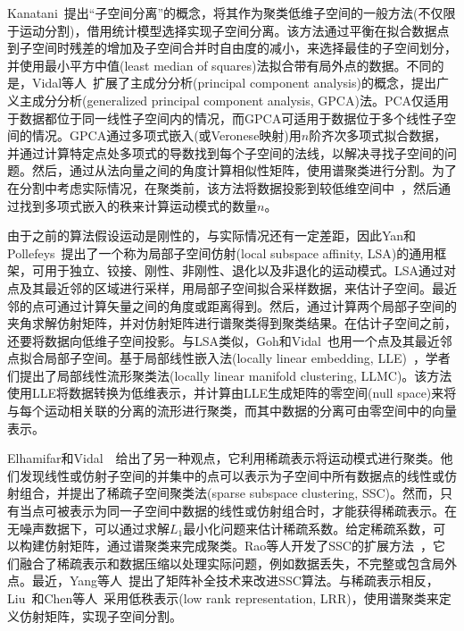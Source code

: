 Kanatani~\cite{kanatani2001motion}提出“子空间分离”的概念，将其作为聚类低维子空间的一般方法(不仅限于运动分割)，借用统计模型选择实现子空间分离。该方法通过平衡在拟合数据点到子空间时残差的增加及子空间合并时自由度的减小，来选择最佳的子空间划分，并使用最小平方中值(least median of squares)法拟合带有局外点的数据。不同的是，Vidal等人~\cite{vidal2005generalized}扩展了主成分分析(principal component analysis)的概念，提出广义主成分分析(generalized principal component analysis, GPCA)法。PCA仅适用于数据都位于同一线性子空间内的情况，而GPCA可适用于数据位于多个线性子空间的情况。GPCA通过多项式嵌入(或Veronese映射)用$n$阶齐次多项式拟合数据，并通过计算特定点处多项式的导数找到每个子空间的法线，以解决寻找子空间的问题。然后，通过从法向量之间的角度计算相似性矩阵，使用谱聚类进行分割。为了在分割中考虑实际情况，在聚类前，该方法将数据投影到较低维空间中~\cite{vidal2005generalized}，然后通过找到多项式嵌入的秩来计算运动模式的数量$n$。

由于之前的算法假设运动是刚性的，与实际情况还有一定差距，因此Yan和Pollefeys~\cite{yan2006general}提出了一个称为局部子空间仿射(local subspace affinity, LSA)的通用框架，可用于独立、铰接、刚性、非刚性、退化以及非退化的运动模式。LSA通过对点及其最近邻的区域进行采样，用局部子空间拟合采样数据，来估计子空间。最近邻的点可通过计算矢量之间的角度或距离得到。然后，通过计算两个局部子空间的夹角求解仿射矩阵，并对仿射矩阵进行谱聚类得到聚类结果。在估计子空间之前，还要将数据向低维子空间投影。与LSA类似，Goh和Vidal~\cite{goh2007segmenting}也用一个点及其最近邻点拟合局部子空间。基于局部线性嵌入法(locally linear embedding, LLE)~\cite{saul2003think}，学者们提出了局部线性流形聚类法(locally linear manifold clustering, LLMC)。该方法使用LLE将数据转换为低维表示，并计算由LLE生成矩阵的零空间(null space)来将与每个运动相关联的分离的流形进行聚类，而其中数据的分离可由零空间中的向量表示。

Elhamifar和Vidal~\cite{elhamifar2009sparse}~\cite{elhamifar2013sparse}给出了另一种观点，它利用稀疏表示将运动模式进行聚类。他们发现线性或仿射子空间的并集中的点可以表示为子空间中所有数据点的线性或仿射组合，并提出了稀疏子空间聚类法(sparse subspace clustering, SSC)。然而，只有当点可被表示为同一子空间中数据的线性或仿射组合时，才能获得稀疏表示。在无噪声数据下，可以通过求解$L_1$最小化问题来估计稀疏系数。给定稀疏系数，可以构建仿射矩阵，通过谱聚类来完成聚类。Rao等人开发了SSC的扩展方法~\cite{rao2009motion}，它们融合了稀疏表示和数据压缩以处理实际问题，例如数据丢失，不完整或包含局外点。最近，Yang等人~\cite{yang2015sparse}提出了矩阵补全技术来改进SSC算法。与稀疏表示相反，Liu~\cite{liu2012robust}和Chen等人~\cite{liu2010robust}采用低秩表示(low rank representation, LRR)，使用谱聚类来定义仿射矩阵，实现子空间分割。

